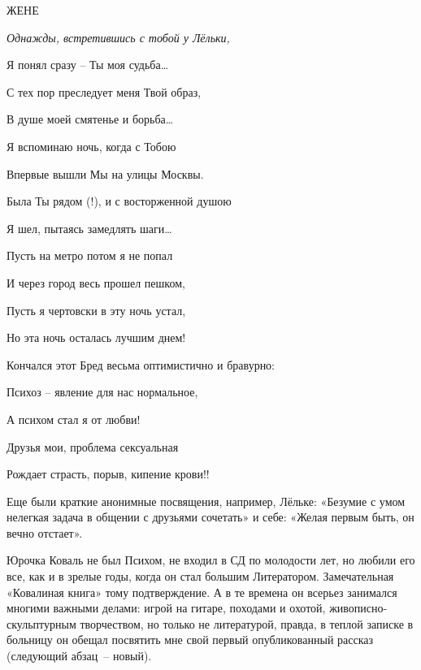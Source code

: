 \indent

\begin{center}
ЖЕНЕ
\end{center}

{\itshape
Однажды, встретившись с тобой у Лёльки,

Я понял сразу – Ты моя судьба…

С тех пор преследует меня Твой образ,

В душе моей смятенье и борьба…

\indent

Я вспоминаю ночь, когда с Тобою

Впервые вышли Мы на улицы Москвы.

Была Ты рядом (!), и с восторженной душою

Я шел, пытаясь замедлять шаги…

\indent

Пусть на метро потом я не попал

И через город весь прошел пешком,

Пусть я чертовски в эту ночь устал,

Но эта ночь осталась лучшим днем!

\indent

}

Кончался этот Бред весьма оптимистично и бравурно:

{\itshape

\indent

	Психоз – явление для нас нормальное,
	
	А психом стал я от любви!
	
	Друзья мои, проблема сексуальная
	
	Рождает страсть, порыв, кипение крови!!

}

\indent

	Еще были краткие анонимные посвящения, например, Лёльке: «Безумие с умом нелегкая задача в общении с друзьями сочетать» и себе: «Желая первым быть, он вечно отстает».


Юрочка Коваль  не был Психом, не входил в СД по молодости лет, но любили его все, как и в зрелые годы, когда он стал большим Литератором. Замечательная «Ковалиная книга» тому подтверждение. А в те времена он всерьез занимался многими важными делами: игрой на гитаре, походами и охотой, живописно-скульптурным творчеством, но только не литературой, правда, в теплой записке в больницу он обещал посвятить мне свой первый опубликованный рассказ (следующий абзац~-- новый). 

